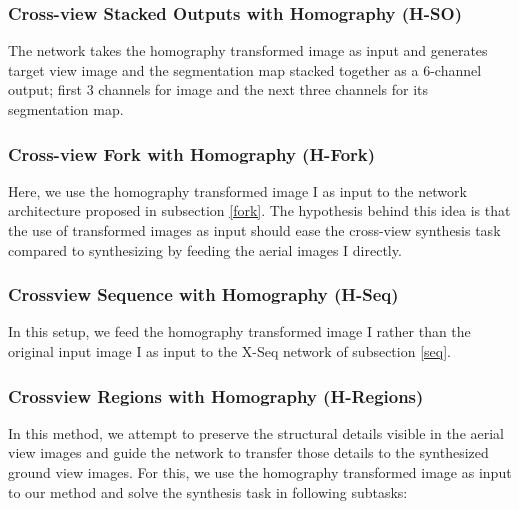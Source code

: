 \documentclass[times,twocolumn,final,authoryear]{elsarticle_modified}
\begin{document}
\vspace{-5pt}

\subsubsection{Cross-view Stacked Outputs with Homography (H-SO)} 
The network takes the homography transformed image  as input and generates target view image and the segmentation map stacked together as a 6-channel output; first 3 channels for image and the next three channels for its segmentation map. 


\vspace{-5pt}

\subsubsection{Cross-view Fork with Homography (H-Fork)}
Here, we use the homography transformed image I as input to the network architecture proposed in subsection \ref{fork}. The hypothesis behind this idea is that the use of transformed images as input should ease the cross-view synthesis task compared to synthesizing by feeding the aerial images I directly.

\vspace{-5pt}

\subsubsection{Crossview Sequence with Homography (H-Seq)}
In this setup, we feed the homography transformed image I rather than the original input image I as input to the X-Seq network of subsection \ref{seq}.

\vspace{-5pt}

\subsubsection{Crossview Regions with Homography (H-Regions)}
In this method, we attempt to preserve the structural details visible in the aerial view images and guide the network to transfer those details to the synthesized ground view images. For this, we use the homography transformed image as input to our method and solve the synthesis task in following subtasks:
\end{document}
